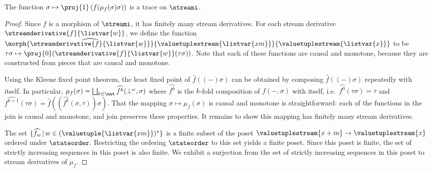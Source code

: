 \begin{proposition}[\protect\footnotemark]
    The function \(\sigma \mapsto \proj{1}\left(f(\mu_f(\sigma)\sigma)\right)\)
    is a trace on \(\streami\).
\end{proposition}
\begin{proof}
    Since \(f\) is a morphism of \(\streami\), it has finitely many stream
    derivatives.
    For each stream derivative \(\streamderivative{f}{\listvar{w}}\), we define
    the function \(
        \morph{
            \widehat{\streamderivative{f}{\listvar{w}}}
        }{
            \valuetuplestream{\listvar{xm}}
        }{
            \valuetuplestream{\listvar{x}}
        }
    \) to be \(
        \tau\sigma
        \mapsto
        \proj{0}(\streamderivative{f}{\listvar{w}}(\tau\sigma))
    \).
    Note that each of these functions are causal and monotone, because they are
    constructed from pieces that are causal and monotone.

    Using the Kleene fixed point theorem, the least fixed point of
    \(\widehat{f}((-)\sigma)\) can be obtained by composing
    \(\widehat{f}((-)\sigma)\) repeatedly with itself.
    In particular, \(
        \mu_f(\sigma)
        =
        \bigsqcup_{k \in \nat} \widehat{f^k}(\bot^\omega,\sigma)
    \) where \(\widehat{f^k}\) is the \(k\)-fold composition of \(f(-,\sigma)\)
    with itself, i.e.\ \(\widehat{f^0}(\tau\sigma) = \tau\) and \(
        \widehat{f^{k+1}}(\tau\sigma)
        =
        \widehat{f}\left(\left(\widehat{f^{k}}(\sigma, \tau)\right)\sigma\right)
    \).
    That the mapping \(\sigma \mapsto \mu_f(\sigma)\) is causal and monotone is
    straightforward: each of the functions in the join is causal and monotone,
    and join preserves these properties.
    It remains to show this mapping has finitely many stream derivatives.

    The set \(\{\widehat{f_w} \,|\, w \in (\valuetuple{\listvar{xm}})^\star\}\)
    is a finite subset of the poset
    \(\valuetuplestream{x+m} \to \valuetuplestream{x}\) ordered under
    \(\stateorder\).
    Restricting the ordering \(\stateorder\) to this set yields a finite poset.
    Since this poset is finite, the set of strictly increasing sequences in this
    poset is also finite.
    We exhibit a surjection from the set of strictly increasing sequences in
    this poset to stream derivatives of \(\mu_f\).


\end{proof}
